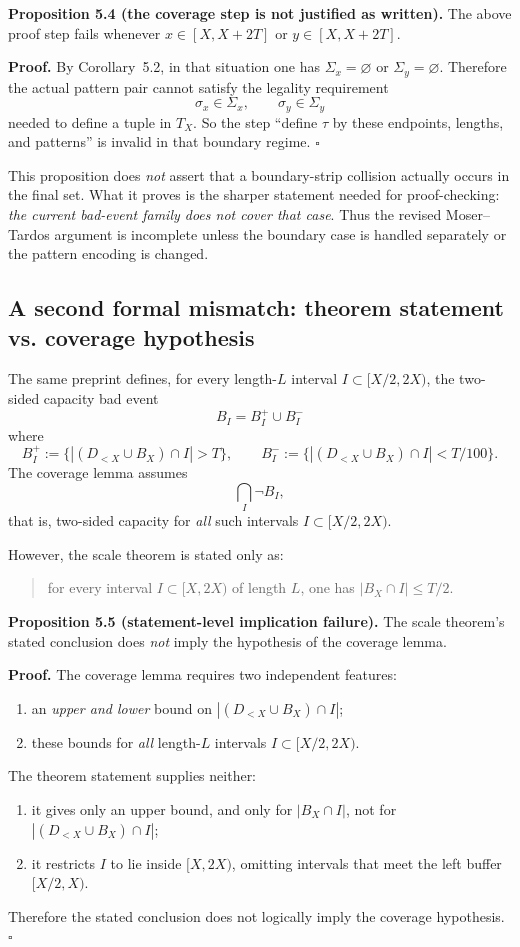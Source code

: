 \textbf{Proposition 5.4 (the coverage step is not justified as written).}
The above proof step fails whenever $x\in[X,X+2T]$ or $y\in[X,X+2T]$.

\textbf{Proof.}
By Corollary~5.2, in that situation one has $\Sigma_x=\varnothing$ or $\Sigma_y=\varnothing$. Therefore the actual pattern pair cannot satisfy the legality requirement
\[
\sigma_x\in\Sigma_x,
\qquad
\sigma_y\in\Sigma_y
\]
needed to define a tuple in $T_X$. So the step ``define $\tau$ by these endpoints, lengths, and patterns'' is invalid in that boundary regime. \hfill$\square$

\medskip

This proposition does \emph{not} assert that a boundary-strip collision actually occurs in the final set. What it proves is the sharper statement needed for proof-checking: \emph{the current bad-event family does not cover that case}. Thus the revised Moser--Tardos argument is incomplete unless the boundary case is handled separately or the pattern encoding is changed.

\subsection{A second formal mismatch: theorem statement vs. coverage hypothesis}

The same preprint defines, for every length-$L$ interval $I\subset[X/2,2X)$, the two-sided capacity bad event
\[
B_I=B_I^+\cup B_I^-
\]
where
\[
B_I^+ := \{ |(D_{<X}\cup B_X)\cap I|>T\},
\qquad
B_I^- := \{ |(D_{<X}\cup B_X)\cap I|<T/100\}.
\]
The coverage lemma assumes
\[
\bigcap_I \neg B_I,
\]
that is, two-sided capacity for \emph{all} such intervals $I\subset[X/2,2X)$.

However, the scale theorem is stated only as:
\begin{quote}
for every interval $I\subset[X,2X)$ of length $L$, one has $|B_X\cap I|\le T/2$.
\end{quote}

\textbf{Proposition 5.5 (statement-level implication failure).}
The scale theorem's stated conclusion does \emph{not} imply the hypothesis of the coverage lemma.

\textbf{Proof.}
The coverage lemma requires two independent features:
\begin{enumerate}
\item an \emph{upper and lower} bound on $|(D_{<X}\cup B_X)\cap I|$;
\item these bounds for \emph{all} length-$L$ intervals $I\subset[X/2,2X)$.
\end{enumerate}
The theorem statement supplies neither:
\begin{enumerate}
\item it gives only an upper bound, and only for $|B_X\cap I|$, not for $|(D_{<X}\cup B_X)\cap I|$;
\item it restricts $I$ to lie inside $[X,2X)$, omitting intervals that meet the left buffer $[X/2,X)$.
\end{enumerate}
Therefore the stated conclusion does not logically imply the coverage hypothesis. \hfill$\square$

